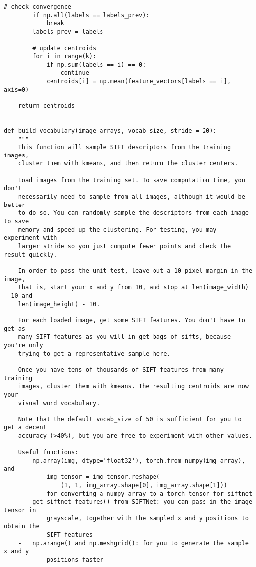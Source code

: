 \begin{lstlisting}[style=Python]
        # check convergence
        if np.all(labels == labels_prev):
            break
        labels_prev = labels
        
        # update centroids
        for i in range(k):
            if np.sum(labels == i) == 0:
                continue
            centroids[i] = np.mean(feature_vectors[labels == i], axis=0)
    
    return centroids


def build_vocabulary(image_arrays, vocab_size, stride = 20):
    """
    This function will sample SIFT descriptors from the training images,
    cluster them with kmeans, and then return the cluster centers.

    Load images from the training set. To save computation time, you don't
    necessarily need to sample from all images, although it would be better
    to do so. You can randomly sample the descriptors from each image to save
    memory and speed up the clustering. For testing, you may experiment with
    larger stride so you just compute fewer points and check the result quickly.

    In order to pass the unit test, leave out a 10-pixel margin in the image,
    that is, start your x and y from 10, and stop at len(image_width) - 10 and
    len(image_height) - 10.

    For each loaded image, get some SIFT features. You don't have to get as
    many SIFT features as you will in get_bags_of_sifts, because you're only
    trying to get a representative sample here.

    Once you have tens of thousands of SIFT features from many training
    images, cluster them with kmeans. The resulting centroids are now your
    visual word vocabulary.

    Note that the default vocab_size of 50 is sufficient for you to get a decent
    accuracy (>40%), but you are free to experiment with other values.

    Useful functions:
    -   np.array(img, dtype='float32'), torch.from_numpy(img_array), and
            img_tensor = img_tensor.reshape(
                (1, 1, img_array.shape[0], img_array.shape[1]))
            for converting a numpy array to a torch tensor for siftnet
    -   get_siftnet_features() from SIFTNet: you can pass in the image tensor in
            grayscale, together with the sampled x and y positions to obtain the
            SIFT features
    -   np.arange() and np.meshgrid(): for you to generate the sample x and y
            positions faster


\end{lstlisting}
